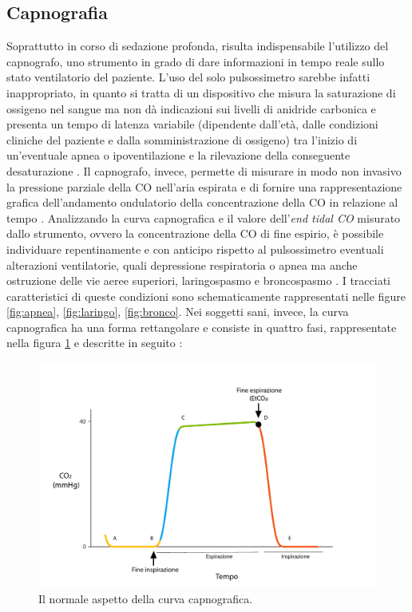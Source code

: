\subsection*{Capnografia}
Soprattutto in corso di sedazione profonda, risulta indispensabile l'utilizzo del capnografo, uno strumento in grado di dare informazioni in tempo reale sullo stato ventilatorio del paziente. L'uso del solo pulsossimetro sarebbe infatti inappropriato, in quanto si tratta di un dispositivo che misura la saturazione di ossigeno nel sangue ma non dà indicazioni sui livelli di anidride carbonica e presenta un tempo di latenza variabile (dipendente dall'età, dalle condizioni cliniche del paziente e dalla somministrazione di ossigeno) tra l'inizio di un'eventuale apnea o ipoventilazione e la rilevazione della conseguente desaturazione \cite{Long2017}. Il capnografo, invece, permette di misurare in modo non invasivo la pressione parziale della CO nell'aria espirata e di fornire una rappresentazione grafica dell'andamento ondulatorio della concentrazione della CO in relazione al tempo \cite{Baruch2005}. Analizzando la curva capnografica e il valore dell'\emph{end tidal CO} misurato dallo strumento, ovvero la concentrazione della CO di fine espirio, è possibile individuare repentinamente e con anticipo rispetto al pulsossimetro eventuali alterazioni ventilatorie, quali depressione respiratoria o apnea ma anche ostruzione delle vie aeree superiori, laringospasmo e broncospasmo \cite{Long2017}. I tracciati caratteristici di queste condizioni sono schematicamente rappresentati nelle figure \ref{fig:apnea}, \ref{fig:laringo}, \ref{fig:bronco}.
Nei soggetti sani, invece, la curva capnografica ha una forma rettangolare e consiste in quattro fasi, rappresentate nella figura \ref{fig:curvacapno} e descritte in seguito \cite{Uptodatecapno}: 

\begin{figure}[t]
    \centering
    \includegraphics[width=1\textwidth]{Figure/capnopdf1.pdf}
    \caption{Il normale aspetto della curva capnografica.}
    \label{fig:curvacapno}
\end{figure}

